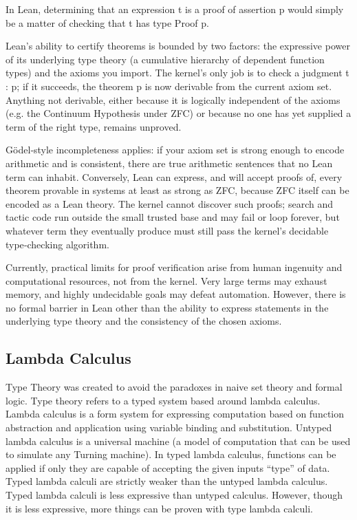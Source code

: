 \documentclass{article}
\newcommand{\1}{\mathbbm{1}}
\theoremstyle{plain}
\theoremstyle{definition}
\numberwithin{equation}{section}
\begin{document}
In Lean, determining that an expression t is a proof of assertion p would simply be a matter of checking that t has type Proof p. 

Lean’s ability to certify theorems is bounded by two factors:  the expressive power of its underlying type theory (a cumulative hierarchy of dependent function types) and the axioms you import. The kernel’s only job is to check a judgment t : p; if it succeeds, the theorem p is now derivable from the current axiom set. Anything not derivable, either because it is logically independent of the axioms (e.g. the Continuum Hypothesis under ZFC) or because no one has yet supplied a term of the right type, remains unproved. 

Gödel‑style incompleteness applies: if your axiom set is strong enough to encode arithmetic and is consistent, there are true arithmetic sentences that no Lean term can inhabit. Conversely, Lean can express, and will accept proofs of, every theorem provable in systems at least as strong as ZFC, because ZFC itself can be encoded as a Lean theory. The kernel cannot discover such proofs; search and tactic code run outside the small trusted base and may fail or loop forever, but whatever term they eventually produce must still pass the kernel’s decidable type‑checking algorithm. 

Currently, practical limits for proof verification arise from human ingenuity and computational resources, not from the kernel. Very large terms may exhaust memory, and highly undecidable goals may defeat automation. However, there is no formal barrier in Lean other than the ability to express statements in the underlying type theory and the consistency of the chosen axioms.

\subsection{Lambda Calculus}

Type Theory was created to avoid the paradoxes in naive set theory and formal logic. Type theory refers to a typed system based around lambda calculus. Lambda calculus is a form system for expressing computation based on function abstraction and application using variable binding and substitution. Untyped lambda calculus is a universal machine (a model of computation that can be used to simulate any Turning machine). In typed lambda calculus, functions can be applied if only they are capable of accepting the given inputs “type” of data. Typed lambda calculi are strictly weaker than the untyped lambda calculus.  Typed lambda calculi is less expressive than untyped calculus. However, though it is less expressive, more things can be proven with type lambda calculi. 
\end{document}
